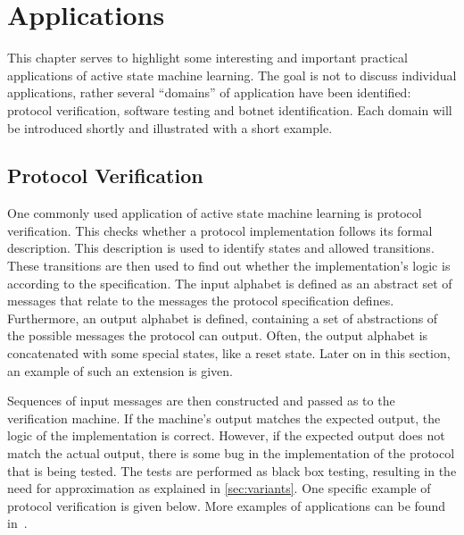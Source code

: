 \documentclass[multi,crop=false,class=article]{standalone}
\begin{document}
\section{Applications}
\label{sec:applications}

This chapter serves to highlight some interesting and important practical
applications of active state machine learning. The goal is not to discuss
individual applications, rather several ``domains'' of application have been
identified: protocol verification, software testing and  botnet identification.
Each domain will be introduced shortly and illustrated with a short example.

\subsection{Protocol Verification}
One commonly used application of active state machine learning is
protocol verification. This checks whether a protocol implementation follows
its formal description. This description is used to identify states and
allowed transitions. These transitions are then used to find out whether the
implementation's logic is according to the specification. The input alphabet
is defined as an abstract set of messages that relate to the messages the
protocol specification defines. Furthermore, an output alphabet is defined,
containing a set of abstractions of the possible messages the protocol can
output. Often, the output alphabet is concatenated with some special states,
like a reset state. Later on in this section, an example of such an extension
is given.

Sequences of input messages are then constructed and passed as to the
verification machine. If the machine's output matches the expected output, the
logic of the implementation is correct. However, if the expected output does
not match the actual output, there is some bug in the implementation of the
protocol that is being tested. The tests are performed as black box testing,
resulting in the need for approximation as explained in \cref{sec:variants}.
One specific example of protocol verification is given below. More examples of
applications can be found in~\cite{Aarts2013,Cho2010,Aarts2010}.
\end{document}
